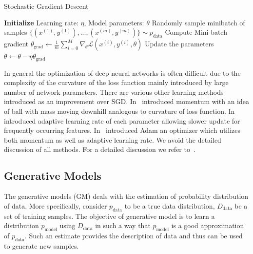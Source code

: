 \begin{algorithm}
\caption{Stochastic Gradient Descent}
\label{alg:grad_des}
\begin{algorithmic}
\State \textbf{Initialize} Learning rate: $\eta$, Model parameters: $\theta$
\Repeat
\State Randomly sample minibatch of samples $\{(x^{(1)},y^{(1)}),...,(x^{(m)},y^{(m)})\}\sim p_\text{data}$ 
\State Compute Mini-batch gradient $\theta_\text{grad} \leftarrow \frac{1}{m}\sum_{i=0}^M \nabla_{\theta}\mathcal{L}(x^{(i)}, y^{(i)},\theta)$
\State Update the parameters $\theta\leftarrow\theta - \eta \theta_\text{grad}$
\State
\end{algorithmic}
\end{algorithm}
In general the optimization of deep neural networks is often difficult due to the complexity of the curvature of the loss function mainly introduced by large number of network parameters. There are various other learning methods introduced as an improvement over SGD. In~\cite{qian1999momentum} introduced momentum with an idea of ball with mass moving downhill analogous to curvature of loss function. In~\cite{duchi2011adaptive} introduced adaptive learning rate of each parameter allowing slower update for frequently occurring features. In~\cite{kingma2014adam} introduced Adam an optimizer which utilizes both momentum as well as adaptive learning rate.
We avoid the detailed discussion of all methods. For a detailed discussion we refer to~\cite{Goodfellow-et-al-2016}.





\subsection{Generative Models}
\label{subsec:gm}
The generative models (GM) deals with the estimation of probability distribution of data. 
More specifically, consider $p_\text{data}$ to be a true data distribution, $D_\text{data}$ be a set of training samples. The objective of generative model is to learn a distribution $p_\text{model}$ using $D_\text{data}$ in such a way that $p_\text{model}$ is a good approximation of $p_\text{data}$. Such an estimate provides the description of data and thus can be used to generate new samples.

